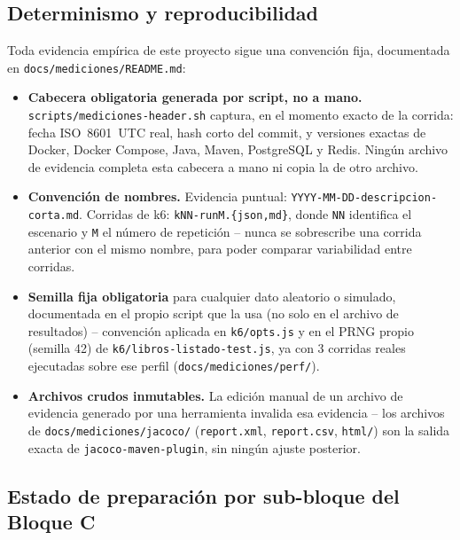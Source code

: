 \documentclass[12pt,a4paper]{article}
\begin{document}
\subsection{Determinismo y reproducibilidad}

Toda evidencia empírica de este proyecto sigue una convención fija,
documentada en \texttt{docs/mediciones/README.md}:

\begin{itemize}[leftmargin=1.2cm]
  \item \textbf{Cabecera obligatoria generada por script, no a mano.}
    \texttt{scripts/mediciones-header.sh} captura, en el momento exacto
    de la corrida: fecha ISO~8601~UTC real, hash corto del commit,
    y versiones exactas de Docker, Docker Compose, Java, Maven,
    PostgreSQL y Redis. Ningún archivo de evidencia completa esta
    cabecera a mano ni copia la de otro archivo.
  \item \textbf{Convención de nombres.} Evidencia puntual:
    \texttt{YYYY-MM-DD-descripcion-corta.md}. Corridas de k6:
    \texttt{kNN-runM.\{json,md\}}, donde \texttt{NN} identifica el
    escenario y \texttt{M} el número de repetición -- nunca se
    sobrescribe una corrida anterior con el mismo nombre, para poder
    comparar variabilidad entre corridas.
  \item \textbf{Semilla fija obligatoria} para cualquier dato aleatorio o
    simulado, documentada en el propio script que la usa (no solo en el
    archivo de resultados) -- convención aplicada en \texttt{k6/opts.js} y
    en el PRNG propio (semilla 42) de
    \texttt{k6/libros-listado-test.js}, ya con 3 corridas reales
    ejecutadas sobre ese perfil (\texttt{docs/mediciones/perf/}).
  \item \textbf{Archivos crudos inmutables.} La edición manual de un
    archivo de evidencia generado por una herramienta invalida esa
    evidencia -- los archivos de \texttt{docs/mediciones/jacoco/}
    (\texttt{report.xml}, \texttt{report.csv}, \texttt{html/}) son la
    salida exacta de \texttt{jacoco-maven-plugin}, sin ningún ajuste
    posterior.
\end{itemize}

\subsection{Estado de preparación por sub-bloque del Bloque C}
\end{document}
